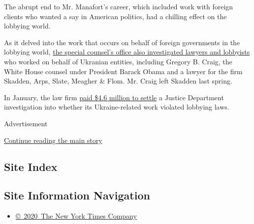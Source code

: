 The abrupt end to Mr. Manafort's career, which included work with
foreign clients who wanted a say in American politics, had a chilling
effect on the lobbying world.

As it delved into the work that occurs on behalf of foreign governments
in the lobbying world,
\href{https://www.nytimes.com/2018/08/01/us/politics/fara-foreign-agents-mueller.html}{the
special counsel's office also investigated lawyers and lobbyists} who
worked on behalf of Ukranian entities, including Gregory B. Craig, the
White House counsel under President Barack Obama and a lawyer for the
firm Skadden, Arps, Slate, Meagher \& Flom. Mr. Craig left Skadden last
spring.

In January, the law firm
\href{https://www.nytimes.com/2019/01/17/us/politics/skadden-arps-ukraine-lobbying-settlement.html}{paid
\$4.6 million to settle} a Justice Department investigation into whether
its Ukraine-related work violated lobbying laws.

Advertisement

\protect\hyperlink{after-bottom}{Continue reading the main story}

\hypertarget{site-index}{%
\subsection{Site Index}\label{site-index}}

\hypertarget{site-information-navigation}{%
\subsection{Site Information
Navigation}\label{site-information-navigation}}

\begin{itemize}
\tightlist
\item
  \href{https://help.nytimes.com/hc/en-us/articles/115014792127-Copyright-notice}{©~2020~The
  New York Times Company}
\end{itemize}

